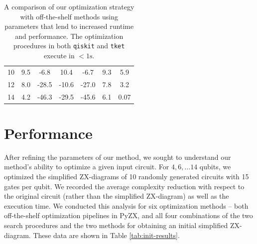 \begin{table}[t]
{\begin{tabular}{@{}ccccccc@{}}
  10                               & 9.5      & -6.8     & 10.4     & -6.7     & 9.3         & 5.9         \\
  12                               & 8.0      & -28.5     & -10.6     & -27.0     & 7.8         & 3.2         \\
  14                               & 4.2      & -46.3     & -29.5     & -45.6     & 6.1         & 0.07         \\
  \bottomrule
  \end{tabular}}
  \caption{\label{tab:compare-results}
    A comparison of our optimization strategy with off-the-shelf methods using parameters that lend to increased runtime and performance.
    The optimization procedures in both {\color{gray}\texttt{qiskit}} and {\color{gray}\texttt{tket}} execute in $<1\text{s}$.
  }
\end{table}




\section{Performance}

After refining the parameters of our method, we sought to understand our method's ability to optimize a given input circuit.
For $4, 6, \dots 14$ qubits, we optimized the simplified ZX-diagrams of 10 randomly generated circuits with 15 gates per qubit.
We recorded the average complexity reduction with respect to the original circuit (rather than the simplified ZX-diagram) as well as the execution time.
We conducted this analysis for six optimization methods -- both off-the-shelf optimization pipelines in PyZX, and all four combinations of the two search procedures and the two methods for obtaining an initial simplified ZX-diagram.
These data are shown in Table \ref{tab:init-results}.

